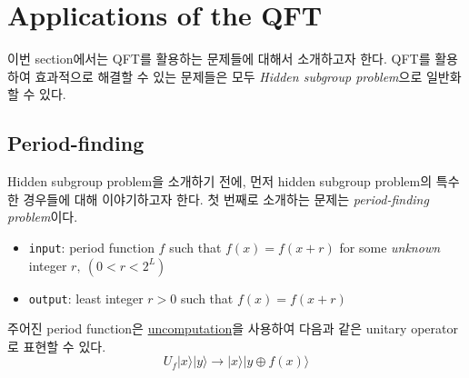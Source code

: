 \section{Applications of the QFT}
이번 section에서는 QFT를 활용하는 문제들에 대해서 소개하고자 한다. QFT를 활용하여 효과적으로 해결할 수 있는 문제들은 모두 \textit{Hidden subgroup problem}으로 일반화할 수 있다.
\subsection{Period-finding}
Hidden subgroup problem을 소개하기 전에, 먼저 hidden subgroup problem의 특수한 경우들에 대해 이야기하고자 한다. 첫 번째로 소개하는 문제는 \textit{period-finding problem}이다.

\begin{itemize}
  \item \texttt{input}: period function $f$ such that $f(x) = f(x+r)$ for some \textit{unknown} integer $r,\ (0 < r < 2^L)$
  \item \texttt{output}: least integer $r>0$ such that $f(x) = f(x+r)$
\end{itemize}
주어진 period function은 \hyperref[sec:uncomputation]{uncomputation}을 사용하여 다음과 같은 unitary operator로 표현할 수 있다.
\begin{equation*}
  U_f|x\rangle|y\rangle \rightarrow|x\rangle|y \oplus f(x)\rangle
\end{equation*}

